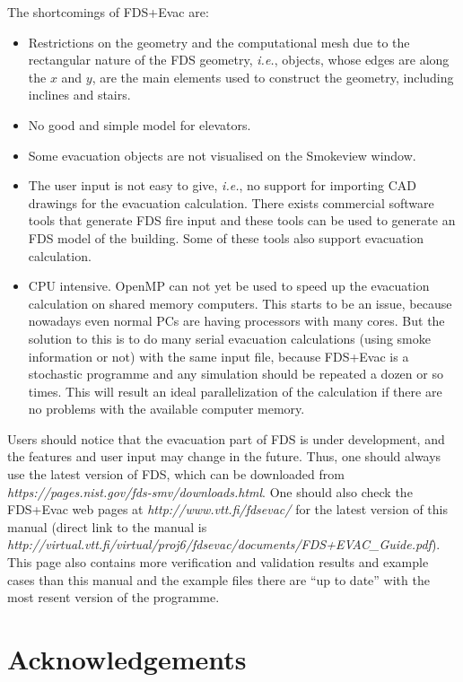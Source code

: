 \documentclass[12pt,a4paper,final,twoside]{stylevk}
\begin{document}
The shortcomings of FDS+Evac are:
%
\begin{itemize}
%
\item Restrictions on the geometry and the computational mesh due to
  the rectangular nature of the FDS geometry, \emph{i.e.}, objects,
  whose edges are along the $x$ and $y$, are the main elements used to
  construct the geometry, including inclines and stairs.
%
\item No good and simple model for elevators.
%
\item Some evacuation objects are not visualised on the Smokeview
  window.
%
\item The user input is not easy to give, \emph{i.e.}, no support for
  importing CAD drawings for the evacuation calculation.  There exists
  commercial software tools that generate FDS fire input and these
  tools can be used to generate an FDS model of the building.  Some of
  these tools also support evacuation calculation.
%
\item CPU intensive.  OpenMP can not yet be used to speed up the
  evacuation calculation on shared memory computers.  This starts to
  be an issue, because nowadays even normal PCs are having processors
  with many cores.  But the solution to this is to do many serial
  evacuation calculations (using smoke information or not) with the
  same input file, because FDS+Evac is a stochastic programme and any
  simulation should be repeated a dozen or so times.  This will result
  an ideal parallelization of the calculation if there are no problems
  with the available computer memory.
%
\end{itemize}
%

Users should notice that the evacuation part of FDS is under
development, and the features and user input may change in the future.
Thus, one should always use the latest version of FDS, which can be
downloaded from \emph{https://pages.nist.gov/fds-smv/downloads.html}.
One should also check the FDS+Evac web pages at
\emph{http://www.vtt.fi/fdsevac/} for the latest version of this
manual (direct link to the manual is
\emph{http://virtual.vtt.fi/virtual/proj6/fdsevac/documents/FDS+EVAC\_Guide.pdf}).
This page also contains more verification and validation results and
example cases than this manual and the example files there are ``up to
date'' with the most resent version of the programme.


\clearpage

\newpage

\chapter*{Acknowledgements}
\end{document}
